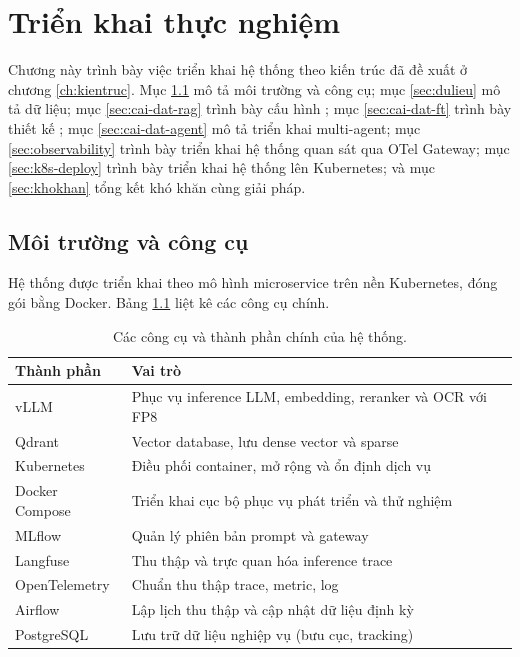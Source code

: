 \chapter{Triển khai thực nghiệm}
\label{ch:trienkhai}

Chương này trình bày việc triển khai hệ thống theo kiến trúc đã đề xuất ở chương
\ref{ch:kientruc}. Mục \ref{sec:moitruong} mô tả môi trường và công cụ; mục
\ref{sec:dulieu} mô tả dữ liệu; mục \ref{sec:cai-dat-rag} trình bày cấu hình \rag; mục
\ref{sec:cai-dat-ft} trình bày thiết kế \ft; mục \ref{sec:cai-dat-agent} mô tả triển khai
multi-agent; mục \ref{sec:observability} trình bày triển khai hệ thống quan sát qua OTel
Gateway; mục \ref{sec:k8s-deploy} trình bày triển khai hệ thống lên Kubernetes; và mục
\ref{sec:khokhan} tổng kết khó khăn cùng giải pháp.

\section{Môi trường và công cụ}
\label{sec:moitruong}

Hệ thống được triển khai theo mô hình microservice trên nền Kubernetes, đóng gói bằng
Docker. Bảng \ref{tab:congcu} liệt kê các công cụ chính.

\begin{table}[htbp]
\centering
\caption{Các công cụ và thành phần chính của hệ thống.}
\label{tab:congcu}
\small
\begin{tabular}{@{}p{3.6cm}p{10.8cm}@{}}
\toprule
\textbf{Thành phần} & \textbf{Vai trò} \\
\midrule
vLLM & Phục vụ inference LLM, embedding, reranker và OCR với FP8 \\
Qdrant & Vector database, lưu dense vector và sparse \\
Kubernetes & Điều phối container, mở rộng và ổn định dịch vụ \\
Docker Compose & Triển khai cục bộ phục vụ phát triển và thử nghiệm \\
MLflow & Quản lý phiên bản prompt và gateway \\
Langfuse & Thu thập và trực quan hóa inference trace \\
OpenTelemetry & Chuẩn thu thập trace, metric, log \\
Airflow & Lập lịch thu thập và cập nhật dữ liệu định kỳ \\
PostgreSQL & Lưu trữ dữ liệu nghiệp vụ (bưu cục, tracking) \\
\bottomrule
\end{tabular}
\end{table}

